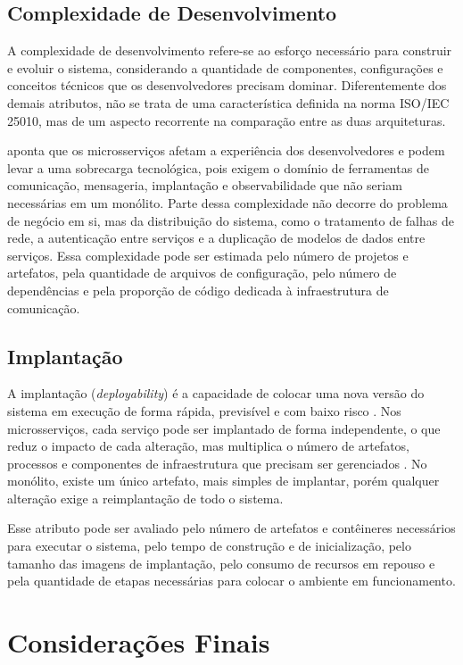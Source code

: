\subsection{Complexidade de Desenvolvimento}

A complexidade de desenvolvimento refere-se ao esforço necessário para construir e evoluir o
sistema, considerando a quantidade de componentes, configurações e conceitos técnicos que os
desenvolvedores precisam dominar. Diferentemente dos demais atributos, não se trata de uma
característica definida na norma ISO/IEC 25010, mas de um aspecto recorrente na comparação
entre as duas arquiteturas.

 aponta que os microsserviços afetam a experiência dos desenvolvedores
e podem levar a uma sobrecarga tecnológica, pois exigem o domínio de ferramentas de
comunicação, mensageria, implantação e observabilidade que não seriam necessárias em um
monólito. Parte dessa complexidade não decorre do problema de negócio em si, mas da
distribuição do sistema, como o tratamento de falhas de rede, a autenticação entre serviços e
a duplicação de modelos de dados entre serviços. Essa complexidade pode ser estimada pelo
número de projetos e artefatos, pela quantidade de arquivos de configuração, pelo número de
dependências e pela proporção de código dedicada à infraestrutura de comunicação.

\subsection{Implantação}

A implantação (\textit{deployability}) é a capacidade de colocar uma nova versão do sistema em
execução de forma rápida, previsível e com baixo risco \cite{bass2021}. Nos microsserviços,
cada serviço pode ser implantado de forma independente, o que reduz o impacto de cada
alteração, mas multiplica o número de artefatos, processos e componentes de infraestrutura que
precisam ser gerenciados \cite{newman2021}. No monólito, existe um único artefato, mais simples
de implantar, porém qualquer alteração exige a reimplantação de todo o sistema.

Esse atributo pode ser avaliado pelo número de artefatos e contêineres necessários para
executar o sistema, pelo tempo de construção e de inicialização, pelo tamanho das imagens de
implantação, pelo consumo de recursos em repouso e pela quantidade de etapas necessárias para
colocar o ambiente em funcionamento.

\section{Considerações Finais}

